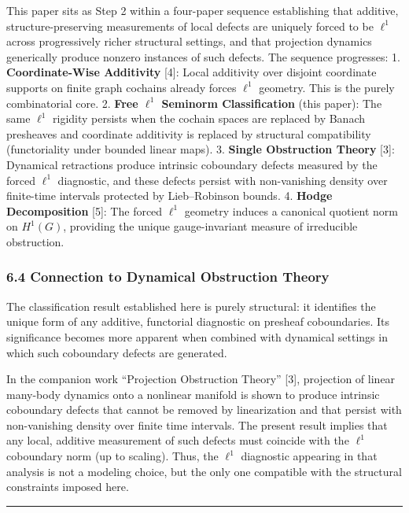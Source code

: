 \documentclass[
]{article}
\begin{document}
This paper sits as Step 2 within a four-paper sequence establishing that
additive, structure-preserving measurements of local defects are
uniquely forced to be \(\ell^1\) across progressively richer structural
settings, and that projection dynamics generically produce nonzero
instances of such defects. The sequence progresses: 1.
\textbf{Coordinate-Wise Additivity} {[}4{]}: Local additivity over
disjoint coordinate supports on finite graph cochains already forces
\(\ell^1\) geometry. This is the purely combinatorial core. 2.
\textbf{Free \(\ell^1\) Seminorm Classification} (this paper): The same
\(\ell^1\) rigidity persists when the cochain spaces are replaced by
Banach presheaves and coordinate additivity is replaced by structural
compatibility (functoriality under bounded linear maps). 3.
\textbf{Single Obstruction Theory} {[}3{]}: Dynamical retractions
produce intrinsic coboundary defects measured by the forced \(\ell^1\)
diagnostic, and these defects persist with non-vanishing density over
finite-time intervals protected by Lieb--Robinson bounds. 4.
\textbf{Hodge Decomposition} {[}5{]}: The forced \(\ell^1\) geometry
induces a canonical quotient norm on \(H^1(G)\), providing the unique
gauge-invariant measure of irreducible obstruction.

\subsubsection{6.4 Connection to Dynamical Obstruction
Theory}\label{connection-to-dynamical-obstruction-theory}

The classification result established here is purely structural: it
identifies the unique form of any additive, functorial diagnostic on
presheaf coboundaries. Its significance becomes more apparent when
combined with dynamical settings in which such coboundary defects are
generated.

In the companion work ``Projection Obstruction Theory'' {[}3{]},
projection of linear many-body dynamics onto a nonlinear manifold is
shown to produce intrinsic coboundary defects that cannot be removed by
linearization and that persist with non-vanishing density over finite
time intervals. The present result implies that any local, additive
measurement of such defects must coincide with the \(\ell^1\) coboundary
norm (up to scaling). Thus, the \(\ell^1\) diagnostic appearing in that
analysis is not a modeling choice, but the only one compatible with the
structural constraints imposed here.

\begin{center}\rule{0.5\linewidth}{0.5pt}\end{center}
\end{document}
